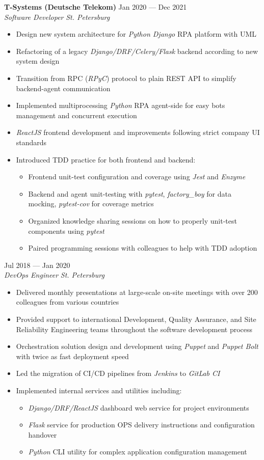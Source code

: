 \documentclass[10pt]{report}
\newenvironment{JobDescription}[5]{
    \vspace{ #5 }
    \flushleft
    {\bf #1 } \hfill { #2 }
    \\
    {\em #3 } \hfill {\em #4 }
    \begin{itemize}
} {
    \end{itemize}
}
\begin{document}
\begin{JobDescription}{T-Systems (Deutsche Telekom)}{Jan 2020 --- Dec 2021}{Software Developer}{St. Petersburg}{0mm}
    \item Design new system architecture for \emph{Python Django} RPA platform with UML
    \item Refactoring of a legacy \emph{Django/DRF/Celery/Flask} backend according to new system design
    \item Transition from RPC (\emph{RPyC}) protocol to plain REST API to simplify backend-agent communication
    \item Implemented multiprocessing \emph{Python} RPA agent-side for easy bots management and concurrent execution
    \item \emph{ReactJS} frontend development and improvements following strict company UI standards
    \item Introduced TDD practice for both frontend and backend:
    \begin{itemize}
        \item Frontend unit-test configuration and coverage using \emph{Jest} and \emph{Enzyme}
        \item Backend and agent unit-testing with \emph{pytest}, \emph{factory\_boy} for data mocking, \emph{pytest-cov}
            for coverage metrics
        \item Organized knowledge sharing sessions on how to properly unit-test components using \emph{pytest}
        \item Paired programming sessions with colleagues to help with TDD adoption
    \end{itemize}
\end{JobDescription}

\begin{JobDescription}{}{Jul 2018 --- Jan 2020}{DevOps Engineer}{St. Petersburg}{-3mm}
    \item Delivered monthly presentations at large-scale on-site meetings with over 200 colleagues from various countries
    \item Provided support to international Development, Quality Assurance, and Site Reliability Engineering teams throughout the software development process
    \item Orchestration solution design and development using \emph{Puppet} and \emph{Puppet Bolt} with twice as fast deployment speed
    \item Led the migration of CI/CD pipelines from \emph{Jenkins} to \emph{GitLab CI}
    \item Implemented internal services and utilities including:
    \begin{itemize}
        \item \emph{Django/DRF/ReactJS} dashboard web service for project environments
        \item \emph{Flask} service for production OPS delivery instructions and configuration handover
        \item \emph{Python} CLI utility for complex application configuration management
    \end{itemize}
\end{JobDescription}
\end{document}
